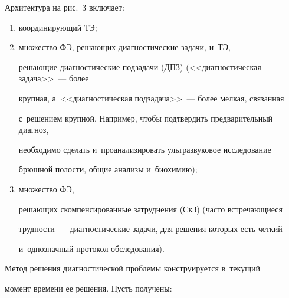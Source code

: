   

  Архитектура на рис.~3 включает: 

  \begin{enumerate}[(1)]

  \item координирующий ТЭ; 

\item множество ФЭ, ре\-ша\-ющих диагностические задачи, и~ТЭ, 

ре\-ша\-ющие диагностические подзадачи (ДПЗ) (<<диагностическая задача>>~--- более 

круп\-ная, а~<<диагностическая подзадача>>~--- более мел\-кая, связанная 

с~решением крупной. Например, чтобы под\-твер\-дить предварительный диагноз, 

необходимо сделать и~проанализировать ульт\-ра\-зву\-ко\-вое исследование 

брюш\-ной по\-лости, общие анализы и~био\-хи\-мию); 

\item множество ФЭ, 

решающих скомпенсированные затруднения (СкЗ) (час\-то встре\-ча\-ющи\-еся 

трудности~--- диагностические задачи, для решения которых есть чет\-кий 

и~однозначный протокол обследования).

\end{enumerate}

  

  Метод решения диагностической проблемы конструируется в~текущий 

момент времени ее решения. Пусть получены: 

